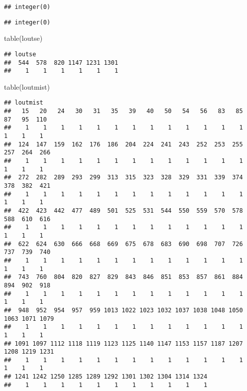 \documentclass[
]{article}
\newenvironment{Shaded}{\begin{snugshade}}{\end{snugshade}}
\newcommand{\FunctionTok}[1]{\textcolor[rgb]{0.00,0.00,0.00}{#1}}
\newcommand{\NormalTok}[1]{#1}
\newcommand{\OtherTok}[1]{\textcolor[rgb]{0.56,0.35,0.01}{#1}}
\newcommand{\SpecialCharTok}[1]{\textcolor[rgb]{0.00,0.00,0.00}{#1}}
\begin{document}
\begin{verbatim}
## integer(0)
\end{verbatim}

\begin{Shaded}
\end{Shaded}

\begin{verbatim}
## integer(0)
\end{verbatim}

\begin{Shaded}
\begin{Highlighting}[]
\FunctionTok{table}\NormalTok{(loutse)}
\end{Highlighting}
\end{Shaded}

\begin{verbatim}
## loutse
##  544  578  820 1147 1231 1301 
##    1    1    1    1    1    1
\end{verbatim}

\begin{Shaded}
\begin{Highlighting}[]
\FunctionTok{table}\NormalTok{(loutmist)}
\end{Highlighting}
\end{Shaded}

\begin{verbatim}
## loutmist
##   15   20   24   30   31   35   39   40   50   54   56   83   85   87   95  110 
##    1    1    1    1    1    1    1    1    1    1    1    1    1    1    1    1 
##  124  147  159  162  176  186  204  224  241  243  252  253  255  257  264  266 
##    1    1    1    1    1    1    1    1    1    1    1    1    1    1    1    1 
##  272  282  289  293  299  313  315  323  328  329  331  339  374  378  382  421 
##    1    1    1    1    1    1    1    1    1    1    1    1    1    1    1    1 
##  422  423  442  477  489  501  525  531  544  550  559  570  578  588  610  616 
##    1    1    1    1    1    1    1    1    1    1    1    1    1    1    1    1 
##  622  624  630  666  668  669  675  678  683  690  698  707  726  737  739  740 
##    1    1    1    1    1    1    1    1    1    1    1    1    1    1    1    1 
##  743  760  804  820  827  829  843  846  851  853  857  861  884  894  902  918 
##    1    1    1    1    1    1    1    1    1    1    1    1    1    1    1    1 
##  948  952  954  957  959 1013 1022 1023 1032 1037 1038 1048 1050 1063 1071 1079 
##    1    1    1    1    1    1    1    1    1    1    1    1    1    1    1    1 
## 1091 1097 1112 1118 1119 1123 1125 1140 1147 1153 1157 1187 1207 1208 1219 1231 
##    1    1    1    1    1    1    1    1    1    1    1    1    1    1    1    1 
## 1241 1242 1250 1285 1289 1292 1301 1302 1304 1314 1324 
##    1    1    1    1    1    1    1    1    1    1    1
\end{verbatim}
\end{document}
